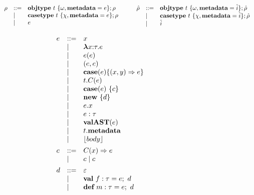 \begin{figure}[t]
\centering
\[
\begin{array}[t]{lll} 
\rho & ::= & \textbf{objtype}~ t~ \{ \omega, \textbf{metadata}=e \}; \rho \\
     & \mathrel{\mid} & \textbf{casetype}~ t~ \{ \chi, \textbf{metadata}=e \}; \rho\\
     & \mathrel{\mid} & e
\\[1ex]
\end{array}
\begin{array}[t]{lll}
~~~
\end{array}
\begin{array}[t]{lll}
\hat\rho & ::= & \textbf{objtype}~ t~ \{ \omega, \textbf{metadata}=\hat i \}; \hat\rho \\
     & \mathrel{\mid} & \textbf{casetype}~ t~ \{ \chi, \textbf{metadata}=\hat i \}; \hat\rho\\
     & \mathrel{\mid} & \hat i
\\[1ex]
\end{array}
\]
\[
\begin{array}[t]{lll} 
e    & \bnfdef & x \\
     & \bnfalt & \boldsymbol\lambda x{:}\tau . e \\ %
     & \bnfalt & e(e) \\
     & \bnfalt & (e, e) \\
     & \bnfalt & \keyw{case}(e) \{(x, y) \Rightarrow e\}\\
     & \bnfalt & t.C(e) \\
     & \bnfalt & \keyw{case}(e)~\{ c \} \\
     & \bnfalt & \keyw{new}~ \{ d \}\\
     & \bnfalt & e.x \\
     & \bnfalt & e : \tau\\
     & \bnfalt & \keyw{valAST}(e) \\
     & \bnfalt & t.\keyw{metadata}\\
     & \bnfalt & \lfloor body \rfloor
\\[1ex]	
c    & \bnfdef & C(x) \Rightarrow e\\
     & \bnfalt & c \bnfalt c
\\[1ex]
d   & \bnfdef & \varepsilon \\
     & \bnfalt & \keyw{val}~ f:\tau = e;~d \\
     & \bnfalt & \keyw{def}~ m:\tau = e;~d
\end{array}
\begin{array}[t]{lll}
~~~
\end{array}
\]
\end{figure}
